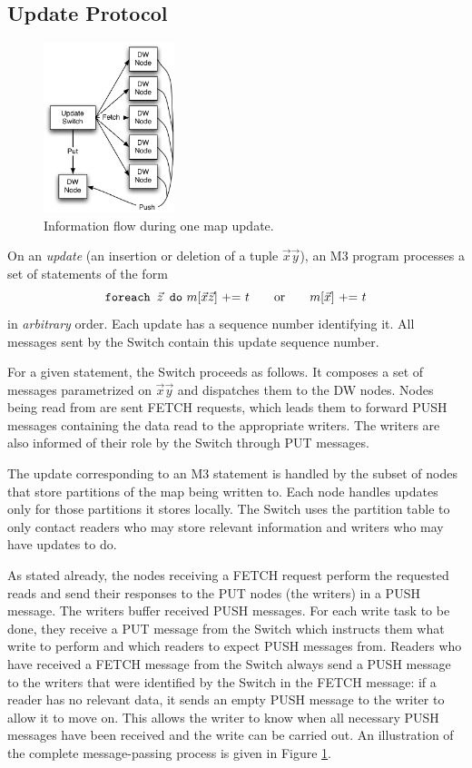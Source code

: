 \subsection{Update Protocol}


\begin{figure}
\begin{center}
\includegraphics[width=1.5in]{images/UpdateStep.pdf}
\caption{Information flow during one map update.}
\label{fig:updatestep}
\end{center}
\end{figure}


On an {\em update} (an insertion or deletion of a tuple
$\vec{x}\vec{y}$), an M3 program processes a set of statements of the form
\[
\mbox{{\tt foreach $\vec{z}$ do} $m[\vec{x}\vec{z}]$ += $t$
~~~~~or~~~~~ $m[\vec{x}]$ += $t$}
\]
in {\em arbitrary}\/ order.
%
Each update has a sequence number identifying it. All messages sent by the
Switch contain this update sequence number.

For a given statement, the Switch proceeds as follows.
It composes a set of messages parametrized on $\vec{x}\vec{y}$ and
dispatches them to the DW nodes.
Nodes being read from are sent FETCH requests, which leads them to forward
PUSH messages containing the data read
to the appropriate writers. The writers are also
informed of their role by the Switch through PUT messages.

The update corresponding to an M3 statement is handled by the subset of
nodes that store partitions of the map being written to.  Each node
handles updates only for those partitions it stores locally. The Switch
uses the partition table to only contact readers who may store relevant information and writers who may have updates to do. 


As stated already, the nodes receiving a FETCH request perform the
requested reads and send their responses to the PUT nodes (the writers)
in a PUSH message.
The writers buffer received PUSH messages. For each write task to be
done, they receive a PUT message from the Switch which instructs them
what write to perform and which readers to expect PUSH messages from.
Readers who have received a FETCH message from the Switch always
send a PUSH message to the writers that were
identified by the Switch in the FETCH
message: if a reader has no relevant data, it sends an empty PUSH message to
the writer to allow it to move on.
This allows the writer to know when all necessary PUSH messages have been
received and the write can be carried out.
An illustration of the complete message-passing process is given
in Figure \ref{fig:updatestep}.  


